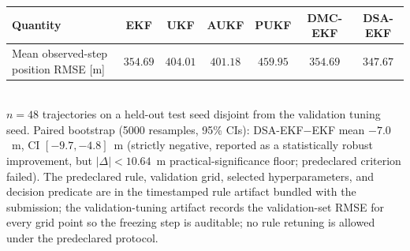 \begin{table}[t]
{\begin{tabular}{lcccccc}
    \toprule
    Quantity & EKF & UKF & AUKF & PUKF & DMC-EKF & DSA-EKF \\
    \midrule
    Mean observed-step position RMSE [m] & $354.69$ & $404.01$ & $401.18$ & $459.95$ & $354.69$ & $\mathbf{347.67}$ \\
    \bottomrule
  \end{tabular}
  }
  \\[2pt] {\footnotesize $n=48$ trajectories on a held-out test seed disjoint from the validation tuning seed. Paired bootstrap (5000 resamples, 95\% CIs): DSA-EKF$-$EKF mean $-7.0$~m, CI $[-9.7, -4.8]$~m (strictly negative, reported as a statistically robust improvement, but $|\Delta|<10.64$~m \mbox{practical-significance} floor; predeclared criterion failed). The predeclared rule, validation grid, selected hyperparameters, and decision predicate are in the timestamped rule artifact bundled with the submission; the validation-tuning artifact records the validation-set RMSE for every grid point so the freezing step is auditable; no rule retuning is allowed under the predeclared protocol.}
\end{table}
